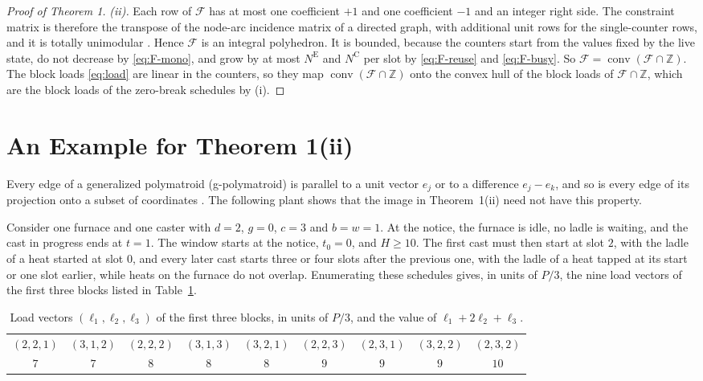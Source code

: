 \documentclass[11pt]{article}
\newcommand{\NE}{N^{\mathrm{E}}}
\newcommand{\NC}{N^{\mathrm{C}}}
\newcommand{\calF}{\mathcal{F}}
\newcommand{\Z}{\mathbb{Z}}
\newcommand{\conv}{\operatorname{conv}}
\begin{document}
\begin{proof}[Proof of Theorem 1]
\emph{(ii).} Each row of $\calF$ has at most one coefficient $+1$ and one coefficient $-1$ and an integer right side.
The constraint matrix is therefore the transpose of the node-arc incidence matrix of a directed graph, with additional
unit rows for the single-counter rows, and it is totally unimodular \cite{durr2011algorithmica}. Hence $\calF$ is an
integral polyhedron. It is bounded, because the counters start from the values fixed by the live state, do not
decrease by \eqref{eq:F-mono}, and grow by at most $\NE$ and $\NC$ per slot by \eqref{eq:F-reuse} and
\eqref{eq:F-busy}. So $\calF=\conv(\calF\cap\Z)$. The block loads \eqref{eq:load} are linear in the counters, so they
map $\conv(\calF\cap\Z)$ onto the convex hull of the block loads of $\calF\cap\Z$, which are the block loads of the
zero-break schedules by (i).
\end{proof}

\section{An Example for Theorem 1(ii)}\label{sec:example}

Every edge of a generalized polymatroid (g-polymatroid) is parallel to a unit vector $e_j$ or to a difference
$e_j-e_k$, and so is every edge of its projection onto a subset of coordinates \cite{mukhi2026tsg}. The following plant
shows that the image in Theorem~1(ii) need not have this property.

Consider one furnace and one caster with $d=2$, $g=0$, $c=3$ and $b=w=1$. At the notice, the furnace is idle, no ladle
is waiting, and the cast in progress ends at $t=1$. The window starts at the notice, $t_0=0$, and $H\ge10$. The first
cast must then start at slot $2$, with the ladle of a heat started at slot $0$, and every later cast starts three or
four slots after the previous one, with the ladle of a heat tapped at its start or one slot earlier, while heats on the
furnace do not overlap. Enumerating these schedules gives, in units of $P/3$, the nine load vectors of the first three
blocks listed in Table~\ref{tab:example}.

\begin{table}[h]
\centering
\caption{Load vectors $(\ell_1,\ell_2,\ell_3)$ of the first three blocks, in units of $P/3$, and the value of
$\ell_1+2\ell_2+\ell_3$.}
\label{tab:example}
\begin{tabular}{ccccccccc}
\toprule
$(2,2,1)$ & $(3,1,2)$ & $(2,2,2)$ & $(3,1,3)$ & $(3,2,1)$ & $(2,2,3)$ & $(2,3,1)$ & $(3,2,2)$ & $(2,3,2)$\\
$7$ & $7$ & $8$ & $8$ & $8$ & $9$ & $9$ & $9$ & $10$\\
\bottomrule
\end{tabular}
\end{table}
\end{document}
